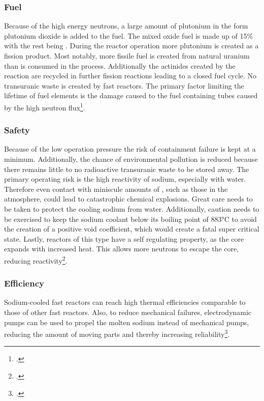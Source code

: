 \subsubsection{Fuel}
Because of the high energy neutrons, a large amount of plutonium in the form
plutonium dioxide  is added to the fuel. The mixed oxide fuel is made up of 15\% 
with the rest being . During the reactor operation more plutonium is created as a fission product.
Most notably, more fissile fuel is created from natural uranium than is consumed in the process.
Additionally the actinides created by the reaction are recycled in further fission reactions leading
to a closed fuel cycle. No transuranic waste is created by fast reactors. The primary
factor limiting the lifetime of fuel elements is the damage caused to the fuel containing tubes
caused by the high neutron flux\footcite[111]{T4Gen}.
\subsubsection{Safety}
Because of the low operation pressure the risk of containment failure is kept at a minimum. Additionally,
the chance of environmental pollution is reduced because there remains little to no radioactive transuranic
waste to be stored away. The primary operating risk is the high reactivity of sodium, especially with water.
Therefore even contact with miniscule amounts of , such as those in the atmosphere, could
lead to catastrophic chemical explosions. Great care needs to be taken to protect the cooling
sodium from water. Additionally, caution needs to be exercised to keep the sodium coolant
below its boiling point of 883°C to avoid the creation of a positive void coefficient, which
would create a fatal super critical state. Lastly, reactors of this type have a self regulating
property, as the core expands with increased heat. This allows more neutrons to escape the
core, reducing reactivity\footcite[30-37]{GIFAR}.
\subsubsection{Efficiency}
Sodium-cooled fast reactors can reach high thermal efficiencies comparable to those of other fast
reactors. Also, to reduce mechanical failures, electrodynamic pumps can be used to propel the
molten sodium instead of mechanical pumps, reducing the amount of moving parts and thereby increasing
reliability\footcite[30-37]{GIFAR}. 
\pagebreak
